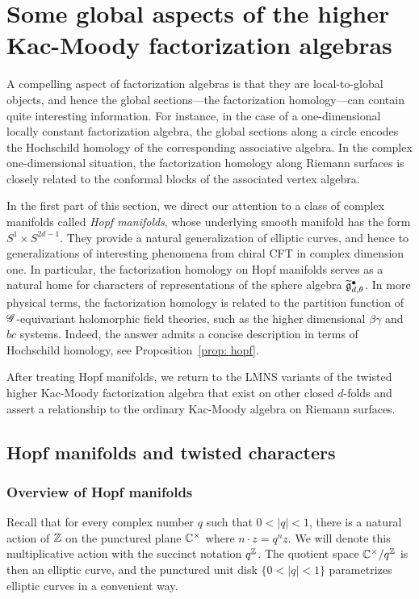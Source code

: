  \section{Some global aspects of the higher Kac-Moody factorization algebras}

A compelling aspect of factorization algebras is that they are local-to-global objects,
and hence the global sections---the factorization homology---can contain quite interesting information.
For instance, in the case of a one-dimensional locally constant factorization algebra, the global sections along a circle encodes the Hochschild homology of the corresponding associative algebra. 
In the complex one-dimensional situation, the factorization homology along Riemann surfaces is closely related to the conformal blocks of the associated vertex algebra. 

In the first part of this section, we direct our attention to a class of complex manifolds called {\em Hopf manifolds},
whose underlying smooth manifold has the form $S^1 \times S^{2d-1}$.
They provide a natural generalization of elliptic curves, and hence to generalizations of interesting phenomena from chiral CFT in complex dimension one.
In particular, the factorization homology on Hopf manifolds serves as a natural home for characters of representations of the sphere algebra $\widetilde{\mathfrak g}_{d,\theta}^\bullet$.
In more physical terms, the factorization homology is related to the partition function of $\mathscr G$-equivariant holomorphic field theories, such as the higher dimensional $\beta\gamma$ and $bc$ systems.
Indeed, the answer admits a concise description in terms of Hochschild homology, see Proposition~\ref{prop: hopf}. 

After treating Hopf manifolds, we return to the LMNS variants of the twisted higher Kac-Moody factorization algebra that exist on other closed $d$-folds and assert a relationship to the ordinary Kac-Moody algebra on Riemann surfaces. 

\subsection{Hopf manifolds and twisted characters}

\subsubsection{Overview of Hopf manifolds}

Recall that for every complex number $q$ such that $0< |q| < 1$, 
there is a natural action of $\mathbb Z$ on the punctured plane $\mathbb C^\times$ where $n \cdot z = q^n z$.
We will denote this multiplicative action with the succinct notation $q^\mathbb Z$.
The quotient space $\mathbb C^\times/q^\mathbb Z$ is then an elliptic curve,
and the punctured unit disk $\{0< |q|<1\}$ parametrizes elliptic curves in a convenient way.

